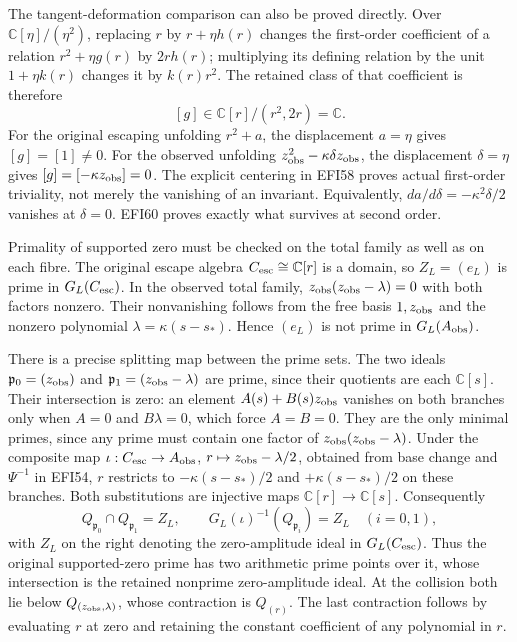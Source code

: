 \documentclass[
  10pt,
  a4paper,
]{article}
\begin{document}
The tangent-deformation comparison can also be proved directly. Over
\(\mathbb C[\eta]/(\eta^2)\), replacing \(r\) by \(r+\eta h(r)\) changes
the first-order coefficient of a relation \(r^2+\eta g(r)\) by
\(2rh(r)\); multiplying its defining relation by the unit
\(1+\eta k(r)\) changes it by \(k(r)r^2\). The retained class of that
coefficient is therefore \[
[g]\in\mathbb C[r]/(r^2,2r)=\mathbb C.
\tag{EFI66}
\] For the original escaping unfolding \(r^2+a\), the displacement
\(a=\eta\) gives \([g]=[1]\ne0\). For the observed unfolding
\(z_{\rm obs}^2-\kappa\delta z_{\rm obs}\), the displacement
\(\delta=\eta\) gives \([g]=[-\kappa z_{\rm obs}]=0\). The explicit
centering in EFI58 proves actual first-order triviality, not merely the
vanishing of an invariant. Equivalently,
\(da/d\delta=-\kappa^2\delta/2\) vanishes at \(\delta=0\). EFI60 proves
exactly what survives at second order.

Primality of supported zero must be checked on the total family as well
as on each fibre. The original escape algebra
\(C_{\rm esc}\cong\mathbb C[r]\) is a domain, so \(Z_L=(e_L)\) is prime
in \(G_L(C_{\rm esc})\). In the observed total family,
\(z_{\rm obs}(z_{\rm obs}-\lambda)=0\) with both factors nonzero. Their
nonvanishing follows from the free basis \(1,z_{\rm obs}\) and the
nonzero polynomial \(\lambda=\kappa(s-s_*)\). Hence \((e_L)\) is not
prime in \(G_L(A_{\rm obs})\).

There is a precise splitting map between the prime sets. The two ideals
\(\mathfrak p_0=(z_{\rm obs})\) and
\(\mathfrak p_1=(z_{\rm obs}-\lambda)\) are prime, since their quotients
are each \(\mathbb C[s]\). Their intersection is zero: an element
\(A(s)+B(s)z_{\rm obs}\) vanishes on both branches only when \(A=0\) and
\(B\lambda=0\), which force \(A=B=0\). They are the only minimal primes,
since any prime must contain one factor of
\(z_{\rm obs}(z_{\rm obs}-\lambda)\). Under the composite map
\(\iota:C_{\rm esc}\to A_{\rm obs}\),
\(r\mapsto z_{\rm obs}-\lambda/2\), obtained from base change and
\(\Psi^{-1}\) in EFI54, \(r\) restricts to \(-\kappa(s-s_*)/2\) and
\(+\kappa(s-s_*)/2\) on these branches. Both substitutions are injective
maps \(\mathbb C[r]\to\mathbb C[s]\). Consequently \[
Q_{\mathfrak p_0}\cap Q_{\mathfrak p_1}=Z_L,\qquad
G_L(\iota)^{-1}(Q_{\mathfrak p_i})=Z_L
\quad(i=0,1),
\tag{EFI67}
\] with \(Z_L\) on the right denoting the zero-amplitude ideal in
\(G_L(C_{\rm esc})\). Thus the original supported-zero prime has two
arithmetic prime points over it, whose intersection is the retained
nonprime zero-amplitude ideal. At the collision both lie below
\(Q_{(z_{\rm obs},\lambda)}\), whose contraction is \(Q_{(r)}\). The
last contraction follows by evaluating \(r\) at zero and retaining the
constant coefficient of any polynomial in \(r\).
\end{document}
